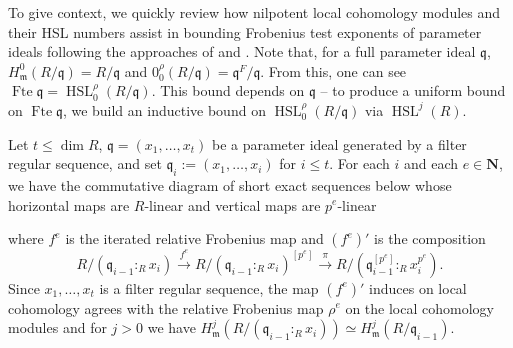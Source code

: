 \documentclass{amsproc}
\theoremstyle{definition}
\theoremstyle{remark}
\numberwithin{equation}{section}
\newcommand{\NN}{\mathbf{N}}
\newcommand{\fm}{\mathfrak{m}}
\newcommand{\fq}{\mathfrak{q}}
\newcommand{\fbp}[1]{\left[ #1 \right]}
\newcommand{\fte}{\operatorname{Fte}}
\newcommand{\HSL}{\operatorname{HSL}}
\begin{document}
To give context, we quickly review how nilpotent local cohomology modules and their HSL numbers assist in bounding Frobenius test exponents of parameter ideals following the approaches of \cite{Mad19} and \cite{Quy19}. Note that, for a full parameter ideal $\fq$, $H_\fm^0(R/\fq) = R/\fq$ and $0^\rho_0(R/\fq) = \fq^F/\fq$. From this, one can see $\fte \fq = \HSL^\rho_0(R/\fq)$. This bound depends on $\fq$ -- to produce a uniform  bound on $\fte \fq$, we build an inductive bound on $\HSL_0^\rho(R/\fq)$ via $\HSL^j(R)$. 

Let $t \leq \dim R$, $\fq = (x_1,\ldots,x_t)$ be a parameter ideal generated by a filter regular sequence, and set $\fq_i := (x_1,\ldots,x_i)$ for $i \leq t$. For each $i$ and each $e\in \NN$, we have the commutative diagram of short exact sequences below whose horizontal maps are $R$-linear and vertical maps are $p^e$-linear \begin{center}
\end{center} where $f^e$ is the iterated relative Frobenius map and $(f^e)'$ is the composition \[
R/\left(\fq_{i-1}:_R x_i\right) \xrightarrow{f^e} R/(\fq_{i-1}:_R x_i)^{\fbp{p^e}} \xrightarrow{\pi} R/\left( \fq_{i-1}^{\fbp{p^e}}:_R x_i^{p^e}\right).
\] Since $x_1,\ldots,x_t$ is a filter regular sequence, the map $(f^e)'$ induces on local cohomology agrees with the relative Frobenius map $\rho^e$ on the local cohomology modules and for $j>0$ we have $H^j_\fm(R/(\fq_{i-1}:_R x_i)) \simeq H^j_\fm(R/\fq_{i-1})$.
\end{document}
